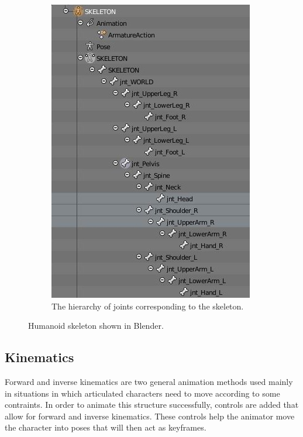 \begin{figure}[h!]
\begin{subfigure}[b]{0.4\textwidth}
                \includegraphics[width=\linewidth]{img/skeleton_hierarchy}
                \caption{The hierarchy of joints corresponding to the skeleton.}
                \label{fig:hierarchy}
        \end{subfigure}%
	\caption{Humanoid skeleton shown in Blender.}
	\label{fig:rig}
\end{figure}

\subsection{Kinematics}
Forward and inverse kinematics are two general animation methods used mainly in situations in which articulated characters need to move according to some contraints. In order to animate this structure successfully, controls are added that allow for forward and inverse kinematics. These controls help the animator move the character into poses that will then act as keyframes.

